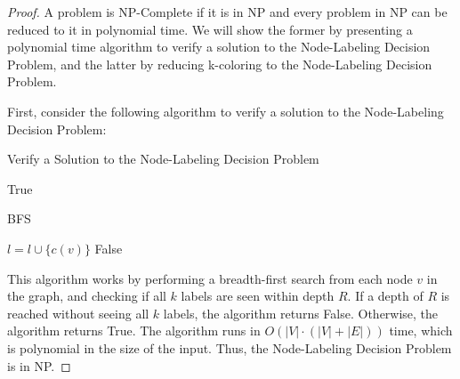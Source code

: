 \documentclass{article}
\begin{document}
\begin{proof}
    A problem is NP-Complete if it is in NP and every problem in NP can be reduced to it in polynomial time.
    We will show the former by presenting a polynomial time algorithm to verify a solution to the Node-Labeling Decision Problem,
    and the latter by reducing k-coloring to the Node-Labeling Decision Problem.
    
    First, consider the following algorithm to verify a solution to the Node-Labeling Decision Problem:

    \begin{algorithm}[H]
        \caption{Verify a Solution to the Node-Labeling Decision Problem}
        \BlankLine
        
        \Return True
    \end{algorithm}
    
    \begin{algorithm}[H]
        \caption{BFS}
        \BlankLine
        $l = l \cup \{c(v)\}$
        \Return False
    \end{algorithm}
    
    This algorithm works by performing a breadth-first search from each node $v$ in the graph,
    and checking if all $k$ labels are seen within depth $R$.
    If a depth of $R$ is reached without seeing all $k$ labels, the algorithm returns False.
    Otherwise, the algorithm returns True.
    The algorithm runs in $O(|V| \cdot (|V| + |E|))$ time, which is polynomial in the size of the input.
    Thus, the Node-Labeling Decision Problem is in NP.


\end{proof}
\end{document}
